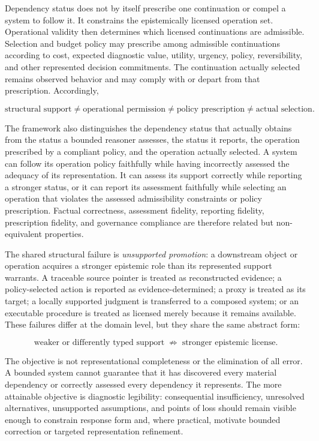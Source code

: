 \documentclass[11pt]{article}
\theoremstyle{definition}
\theoremstyle{remark}
\begin{document}
Dependency status does not by itself prescribe one continuation or compel a system to follow it. It constrains the epistemically licensed operation set. Operational validity then determines which licensed continuations are admissible. Selection and budget policy may prescribe among admissible continuations according to cost, expected diagnostic value, utility, urgency, policy, reversibility, and other represented decision commitments. The continuation actually selected remains observed behavior and may comply with or depart from that prescription. Accordingly,

\[
\boxed{
\text{structural support}
\neq
\text{operational permission}
\neq
\text{policy prescription}
\neq
\text{actual selection}.
}
\]

The framework also distinguishes the dependency status that actually obtains from the status a bounded reasoner assesses, the status it reports, the operation prescribed by a compliant policy, and the operation actually selected. A system can follow its operation policy faithfully while having incorrectly assessed the adequacy of its representation. It can assess its support correctly while reporting a stronger status, or it can report its assessment faithfully while selecting an operation that violates the assessed admissibility constraints or policy prescription. Factual correctness, assessment fidelity, reporting fidelity, prescription fidelity, and governance compliance are therefore related but non-equivalent properties.

The shared structural failure is \emph{unsupported promotion}: a downstream object or operation acquires a stronger epistemic role than its represented support warrants. A traceable source pointer is treated as reconstructed evidence; a policy-selected action is reported as evidence-determined; a proxy is treated as its target; a locally supported judgment is transferred to a composed system; or an executable procedure is treated as licensed merely because it remains available. These failures differ at the domain level, but they share the same abstract form:

\[
\boxed{
\text{weaker or differently typed support}
\;\not\Rightarrow\;
\text{stronger epistemic license}.
}
\]

The objective is not representational completeness or the elimination of all error. A bounded system cannot guarantee that it has discovered every material dependency or correctly assessed every dependency it represents. The more attainable objective is diagnostic legibility: consequential insufficiency, unresolved alternatives, unsupported assumptions, and points of loss should remain visible enough to constrain response form and, where practical, motivate bounded correction or targeted representation refinement.
\end{document}
